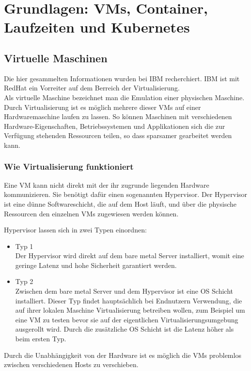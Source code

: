 \chapter[Grundlagen]{Grundlagen: VMs, Container, Laufzeiten und Kubernetes}

\section{Virtuelle Maschinen} 
Die hier gesammelten Informationen wurden bei IBM\cite{vm} recherchiert. IBM ist mit RedHat ein Vorreiter auf dem Berreich der Virtualisierung.\\
Als virtuelle Maschine bezeichnet man die Emulation einer physischen Maschine.
Durch Virtualisierung ist es möglich mehrere dieser \ac{VM}s auf einer Hardwaremaschine laufen zu lassen.
So können Maschinen mit verschiedenen Hardware-Eigenschaften, Betriebssystemen und Applikationen sich die zur Verfügung stehenden Ressourcen teilen, so dass sparsamer gearbeitet werden kann.

\subsection{Wie Virtualisierung funktioniert}
Eine \ac{VM} kann nicht direkt mit der ihr zugrunde liegenden Hardware kommunizieren. 
Sie benötigt dafür einen sogenannten Hypervisor.
Der Hypervisor ist eine dünne Softwareschicht, die auf dem Host läuft, und über die physische Ressourcen den einzelnen \ac{VM}s zugewiesen werden können.

Hypervisor lassen sich in zwei Typen einordnen:
\begin{itemize}
    \item Typ 1 \\ 
            Der Hypervisor wird direkt auf dem bare metal Server installiert, womit eine geringe Latenz und hohe Sicherheit garantiert werden.
    \item Typ 2\\
            Zwischen dem bare metal Server und dem Hypervisor ist eine \ac{OS} Schicht installiert. 
            Dieser Typ findet hauptsächlich bei Endnutzern Verwendung, die auf ihrer lokalen Maschine Virtualisierung betreiben wollen, zum Beispiel um eine \ac{VM} zu testen bevor sie auf der eigentlichen Virtualisierungsumgebung ausgerollt wird.
            Durch die zusätzliche \ac{OS} Schicht ist die Latenz höher als beim ersten Typ.
\end{itemize}

Durch die Unabhängigkeit von der Hardware ist es möglich die \ac{VM}s problemlos zwischen verschiedenen Hosts zu verschieben. \\

